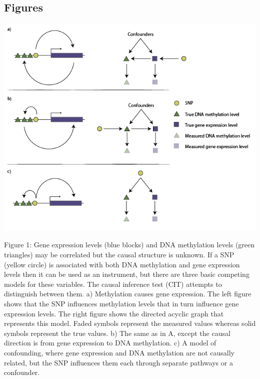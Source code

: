 \documentclass[]{article}
\begin{document}
\newpage

\subsection{Figures}\label{figures}

\includegraphics{../images/dag-01.png}

Figure 1: Gene expression levels (blue blocks) and DNA methylation
levels (green triangles) may be correlated but the causal structure is
unknown. If a SNP (yellow circle) is associated with both DNA
methylation and gene expression levels then it can be used as an
instrument, but there are three basic competing models for these
variables. The causal inference test (CIT) attempts to distinguish
between them. a) Methylation causes gene expression. The left figure
shows that the SNP influences methylation levels that in turn influence
gene expression levels. The right figure shows the directed acyclic
graph that represents this model. Faded symbols represent the measured
values whereas solid symbols represent the true values. b) The same as
in A, except the causal direction is from gene expression to DNA
methylation. c) A model of confounding, where gene expression and DNA
methylation are not causally related, but the SNP influences them each
through separate pathways or a confounder.

\newpage
\end{document}

